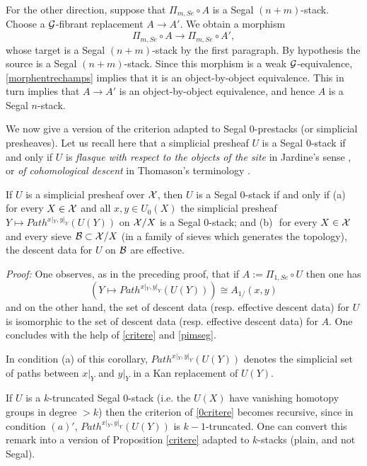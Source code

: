 For the other direction, suppose that $\Pi _{m,Se}\circ A$ is a Segal
$(n+m)$-stack. Choose a ${\cal G}$-fibrant replacement $A\rightarrow A'$. We obtain
a morphism
$$
\Pi _{m,Se}\circ A\rightarrow \Pi _{m,Se}\circ A',
$$
whose target is a Segal $(n+m)$-stack by the first paragraph. By hypothesis the
source is a Segal $(n+m)$-stack. Since this morphism is a weak
${\cal G}$-equivalence, \ref{morphentrechamps} implies that it is an
object-by-object equivalence. This in turn implies that $A\rightarrow A'$ is an
object-by-object equivalence, and hence $A$ is a Segal $n$-stack.
\eop


We now give a version of the criterion adapted to Segal $0$-prestacks (or
simplicial presheaves). Let us recall here that a simplicial presheaf $U$ is a
Segal $0$-stack if and only if $U$ is {\em flasque with respect to the objects
of the site} in Jardine's sense \cite{Jardine}, or {\em of cohomological
descent} in Thomason's terminology \cite{Thomason} \cite{TravauxThomason}.

\begin{corollary}
\label{0critere}
If $U$ is a simplicial presheaf over ${\cal X}$, then $U$ is a Segal $0$-stack if
and only if
\newline
(a)\,\, for every $X\in {\cal X}$ and all $x,y\in U_0(X)$ the simplicial presheaf
\newline
$Y\mapsto Path ^{x|_Y,y|_Y}(U(Y))$ on ${\cal X} /X$ is a Segal $0$-stack; and
\newline
(b)\,\, for every $X\in {\cal X}$ and every sieve ${\cal B} \subset {\cal X} /X$ (in a family
of sieves which generates the topology), the descent data for $U$ on ${\cal B}$ are
effective.
\end{corollary}
{\em Proof:}
One observes, as in the preceding proof, that if $A:= \Pi _{1,Se}\circ U$ then
one has
$$
\left( Y\mapsto Path ^{x|_Y,y|_Y}(U(Y))\right) \cong A_{1/}(x,y)
$$
and on the other hand, the set of descent data (resp. effective descent data)
for $U$ is isomorphic to the set of descent data (resp. effective descent
data) for $A$. One concludes with the help of \ref{critere} and \ref{pimseg}.
\eop


In condition (a) of this corollary, $Path ^{x|_Y,y|_Y}(U(Y))$ denotes the
simplicial set of paths between $x|_Y$ and $y|_Y$ in a Kan replacement of
$U(Y)$.


If $U$ is a $k$-truncated Segal $0$-stack (i.e. the $U(X)$ have vanishing
homotopy groups in degree $>k$) then the criterion of \ref{0critere} becomes
recursive, since in condition $(a)'$, $Path ^{x|_Y,y|_Y}(U(Y))$ is
$k-1$-truncated. One can convert this remark into a version of Proposition
\ref{critere} adapted to $k$-stacks (plain, and not Segal).


